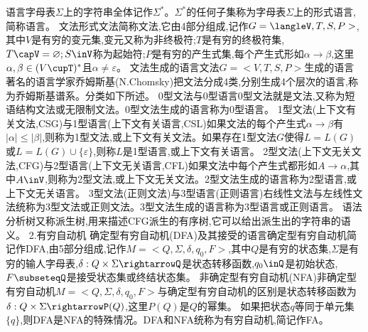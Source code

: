 语言字母表$\Sigma$上的字符串全体记作$\Sigma^{*}$。$\Sigma^{*}$的任何子集称为字母表$\Sigma$上的形式语言,简称语言。
文法形式文法简称文法,它由4部分组成,记作$G=\langleV,T,S,P>$,其中$V$是有穷的变元集,变元又称为非终极符;$T$是有穷的终极符集,$T\capV=\varnothing;S\inV$称为起始符;$P$是有穷的产生式集,每个产生式形如$\alpha\rightarrow\beta$,这里$\alpha,\beta\in(V\cupT)^{*}$且$\alpha\neq\varepsilon$。
文法生成的语言文法$G=<V,T,S,P>$生成的语言
著名的语言学家乔姆斯基(N.Chomsky)把文法分成4类,分别生成4个层次的语言,称为乔姆斯基谱系。分类如下所述。
0型文法与0型语言0型文法就是文法,又称为短语结构文法或无限制文法。0型文法生成的语言称为0型语言。
1型文法(上下文有关文法,CSG)与1型语言(上下文有关语言,CSL)如果文法的每个产生式$\alpha\rightarrow\beta$有$|\alpha|\leqslant|\beta|$,则称为1型文法,或上下文有关文法。如果存在1型文法$G$使得$L=L(G)$或$L=L(G)\cup\{\varepsilon\}$,则称$L$是1型语言,或上下文有关语言。
2型文法(上下文无关文法,CFG)与2型语言(上下文无关语言,CFL)如果文法中每个产生式都形如$A\rightarrow\alpha$,其中$A\inV$,则称为2型文法,或上下文无关文法。2型文法生成的语言称为2型语言,或上下文无关语言。
3型文法(正则文法)与3型语言(正则语言)右线性文法与左线性文法统称为3型文法或正则文法。3型文法生成的语言称为3型语言或正则语言。
语法分析树又称派生树,用来描述CFG派生的有序树,它可以给出派生出的字符串的语义。
{2.有穷自动机}
确定型有穷自动机(DFA)及其接受的语言确定型有穷自动机简记作DFA,由5部分组成,记作$M=<Q,\Sigma,\delta,q_{0},F>$,其中$Q$是有穷的状态集,$\Sigma$是有穷的输人字母表,$\delta:Q\times\Sigma\rightarrowQ$是状态转移函数,$q_{0}\inQ$是初始状态,$F\subseteqQ$是接受状态集或终结状态集。
非确定型有穷自动机(NFA)非确定型有穷自动机$M=<Q,\Sigma,\delta,q_{0},F>$与确定型有穷自动机的区别是状态转移函数为$\delta:Q\times\Sigma\rightarrowP(Q)$,这里$P(Q)$是$Q$的幂集。
如果把状态$q$等同于单元集$\{q\}$,则DFA是NFA的特殊情况。DFA和NFA统称为有穷自动机,简记作FA。

